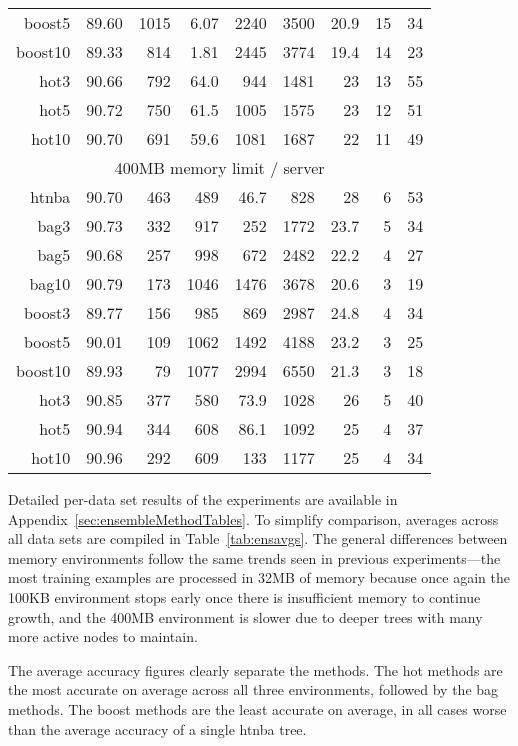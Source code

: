 \begin{table}
\begin{tabular}{|r|r|r|r|r|r|r|r|r|}
{\sc boost5} & 89.60 & 1015 & 6.07 & 2240 & 3500 & 20.9 & 15 & 34 \\
{\sc boost10} & 89.33 & 814 & 1.81 & 2445 & 3774 & 19.4 & 14 & 23 \\
{\sc hot3} & 90.66 & 792 & 64.0 & 944 & 1481 & 23 & 13 & 55 \\
{\sc hot5} & 90.72 & 750 & 61.5 & 1005 & 1575 & 23 & 12 & 51 \\
{\sc hot10} & 90.70 & 691 & 59.6 & 1081 & 1687 & 22 & 11 & 49 \\
\hline
\multicolumn{9}{|c|}{400MB memory limit / server} \\
\hline
{\sc htnba} & 90.70 & 463 & 489 & 46.7 & 828 & 28 & 6 & 53 \\
{\sc bag3} & 90.73 & 332 & 917 & 252 & 1772 & 23.7 & 5 & 34 \\
{\sc bag5} & 90.68 & 257 & 998 & 672 & 2482 & 22.2 & 4 & 27 \\
{\sc bag10} & 90.79 & 173 & 1046 & 1476 & 3678 & 20.6 & 3 & 19 \\
{\sc boost3} & 89.77 & 156 & 985 & 869 & 2987 & 24.8 & 4 & 34 \\
{\sc boost5} & 90.01 & 109 & 1062 & 1492 & 4188 & 23.2 & 3 & 25 \\
{\sc boost10} & 89.93 & 79 & 1077 & 2994 & 6550 & 21.3 & 3 & 18 \\
{\sc hot3} & 90.85 & 377 & 580 & 73.9 & 1028 & 26 & 5 & 40 \\
{\sc hot5} & 90.94 & 344 & 608 & 86.1 & 1092 & 25 & 4 & 37 \\
{\sc hot10} & 90.96 & 292 & 609 & 133 & 1177 & 25 & 4 & 34 \\
\hline
\end{tabular}
\end{table}

Detailed per-data set results of the experiments are available in Appendix~\ref{sec:ensembleMethodTables}. To simplify comparison, averages across all data sets are compiled in Table~\ref{tab:ensavgs}. The general differences between memory environments follow the same trends seen in previous experiments---the most training examples are processed in 32MB of memory because once again the 100KB environment stops early once there is insufficient memory to continue growth, and the 400MB environment is slower due to deeper trees with many more active nodes to maintain.

The average accuracy figures clearly separate the methods. The {\sc hot} methods are the most accurate on average across all three environments, followed by the {\sc bag} methods. The {\sc boost} methods are the least accurate on average, in all cases worse than the average accuracy of a single {\sc htnba} tree.

